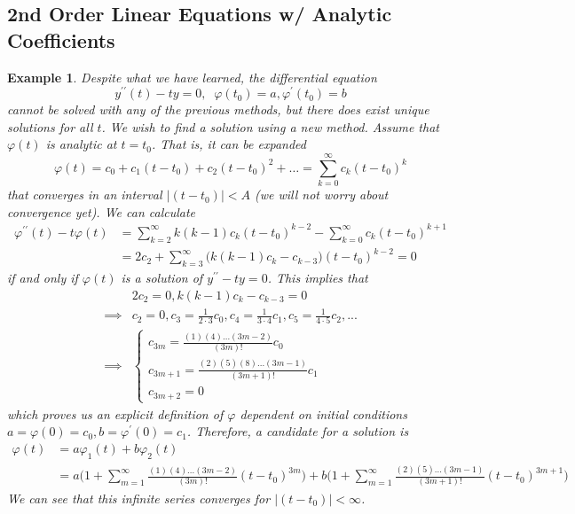 \documentclass{article}
\newtheorem{example}{Example}[section]
\theoremstyle{remark}
\theoremstyle{definition}
\begin{document}
\subsection{2nd Order Linear Equations w/ Analytic Coefficients}
\begin{example}
Despite what we have learned, the differential equation 
\[y^{\prime\prime} (t) - t y = 0, \;\; \varphi(t_0) = a, \varphi^\prime (t_0) = b\]
cannot be solved with any of the previous methods, but there does exist unique solutions for all $t$. We wish to find a solution using a new method. Assume that $\varphi(t)$ is analytic at $t= t_0$. That is, it can be expanded
\[\varphi(t) = c_0 + c_1 (t-t_0) + c_2 (t-t_0)^2 + \ldots = \sum_{k=0}^\infty c_k (t-t_0)^k\]
that converges in an interval $|(t-t_0)| < A$ (we will not worry about convergence yet). We can calculate
\begin{align*}
    \varphi^{\prime\prime} (t) - t \varphi(t) & = \sum_{k=2}^\infty k(k-1) c_k (t-t_0)^{k-2} - \sum_{k=0}^\infty c_k (t-t_0)^{k+1} \\
    & = 2 c_2 + \sum_{k=3}^\infty \big( k(k-1) c_k - c_{k-3}\big) (t-t_0)^{k-2} = 0
\end{align*}
if and only if $\varphi(t)$ is a solution of $y^{\prime\prime} - t y = 0$. This implies that 
\begin{align*}
    & 2 c_2 = 0, k(k-1) c_k - c_{k-3} = 0 \\
    \implies & c_2 = 0, c_3 = \frac{1}{2 \cdot 3} c_0, c_4 = \frac{1}{3 \cdot 4} c_1, c_5 = \frac{1}{4 \cdot 5} c_2, ... \\
    \implies & \begin{cases}
    c_{3m} = \frac{(1)(4)...(3m-2)}{(3m)!} c_0 \\
    c_{3m+1} = \frac{(2)(5)(8)...(3m-1)}{(3m+1)!} c_1 \\
    c_{3m+2} = 0
    \end{cases}
\end{align*}
which proves us an explicit definition of $\varphi$ dependent on initial conditions $a = \varphi(0) = c_0, b = \varphi^\prime (0) = c_1$. Therefore, a candidate for a solution is
\begin{align*}
    \varphi(t) & = a \varphi_1 (t) + b \varphi_2 (t) \\
    & = a \bigg( 1 + \sum_{m=1}^\infty \frac{(1)(4)...(3m-2)}{(3m)!} (t-t_0)^{3m} \bigg) + b \bigg( 1 + \sum_{m=1}^\infty \frac{(2)(5)...(3m-1)}{(3m+1)!} (t-t_0)^{3m+1} \bigg)
\end{align*}
We can see that this infinite series converges for $|(t-t_0)| < \infty$. 
\end{example}
\end{document}
